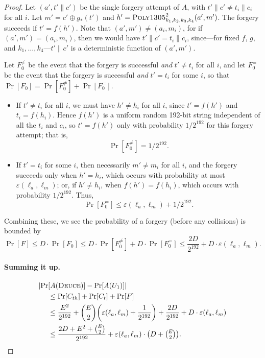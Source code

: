 \documentclass[draft]{article}
\def\operatorsc#1{{%
  \ifmmode\let\next=\operatorname\else\let\next=\relax\fi\next{\textsc{#1}}}}
\def\Poly#1/{\operatorsc{Poly#1}}
\def\Deuce/{\operatorsc{Deuce}}
\newcommand{\concat}{\mathbin\|}
\newcommand{\collisionbound}{\varepsilon}
\begin{document}
\begin{proof}
Let $(a', t' \concat c')$ be the single forgery attempt of $A$,
 with
 $t' \concat c' \ne t_i \concat c_i$
 for all $i$.
Let
 $m' = c' \oplus g_*(t')$
 and
 $h' = \Poly1305/^2_{k_1,k_2,k_3,k_4}(a', m')$.
The forgery succeeds if $t' = f(h')$.
Note that $(a', m') \ne (a_i, m_i)$, for if
 $(a', m') = (a_i, m_i)$,
 then we would have
 $t' \concat c' = t_i \concat c_i$, since---for fixed $f$, $g$, and
 $k_1,\dotsc,k_4$---$t' \concat c'$ is a deterministic function of
 $(a', m')$.

Let $F_0^{\ne}$ be the event that the forgery is successful \emph{and}
 $t' \ne t_i$ for all $i$, and let $F_0^=$ be the event that the
 forgery is successful \emph{and} $t' = t_i$ for some $i$, so that
 $\Pr[F_0] = \Pr[F_0^{\ne}] + \Pr[F_0^=]$.
%
\begin{itemize}
  \item
    If $t' \ne t_i$ for all $i$, we must have $h' \ne h_i$ for all $i$,
     since $t' = f(h')$ and $t_i = f(h_i)$.
    Hence $f(h')$ is a uniform random 192-bit string independent of all
     the $t_i$ and $c_i$, so $t' = f(h')$ only with probability
     $1/2^{192}$ for this forgery attempt; that is,
    \[
      \Pr[F_0^{\ne}] = 1/2^{192}.
    \]
  \item
    If $t' = t_i$ for some $i$, then necessarily $m' \ne m_i$ for all
     $i$, and the forgery succeeds only when $h' = h_i$, which occurs
     with probability at most $\collisionbound(\ell_a, \ell_m)$; or, if
     $h' \ne h_i$, when $f(h') = f(h_i)$, which occurs with probability
     $1/2^{192}$.
    Thus,
    \[
      \Pr[F_0^=] \leq \collisionbound(\ell_a, \ell_m) + 1/2^{192}.
    \]
\end{itemize}
%
Combining these, we see the probability of a forgery (before any
 collisions) is bounded by
\[
  \Pr[F]
  \leq D \cdot \Pr[F_0]
  \leq D \cdot \Pr[F_0^{\ne}] + D \cdot \Pr[F_0^=]
  \leq \frac{2 D}{2^{192}} + D \cdot \collisionbound(\ell_a, \ell_m).
\]

\paragraph*{Summing it up.}

\begin{align*}
  \lvert\Pr&[A(\Deuce/)] - \Pr[A(U_1)]\rvert \\
  &\leq \Pr[C_{th}] + \Pr[C_t] + \Pr[F] \\
  &\leq \frac{E^2}{2^{192}}
     + \binom{E}{2} \biggl(
         \collisionbound(\ell_a, \ell_m)
         + \frac{1}{2^{192}}
       \biggr)
     + \frac{2 D}{2^{192}} + D \cdot \collisionbound(\ell_a, \ell_m) \\
  &\leq \frac{2 D + E^2 + \binom{E}{2}}{2^{192}}
     + \collisionbound(\ell_a, \ell_m)
       \cdot
       {\textstyle\bigl(D + \binom{E}{2}\bigr)}.
  \qedhere
\end{align*}

\end{proof}

\end{document}
